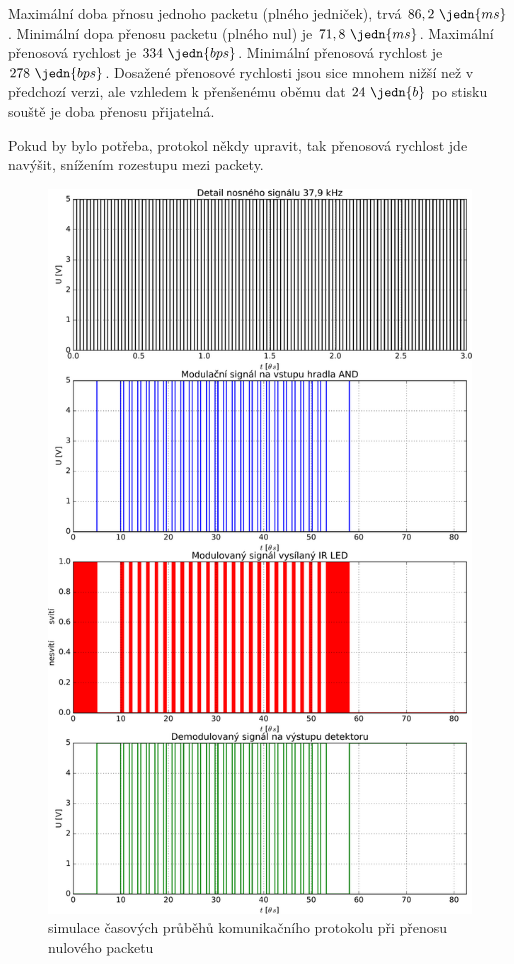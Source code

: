 Maximální doba přnosu jednoho packetu (plného jedniček), trvá $86,2~\jedn{ms}$. Minimální dopa přenosu packetu (plného nul) je $71,8~\jedn{ms}$. Maximální přenosová rychlost je $334~\jedn{bps}$. Minimální přenosová rychlost je $278~\jedn{bps}$. Dosažené přenosové rychlosti jsou sice mnohem nižší než v předchozí verzi, ale vzhledem k přenšenému oběmu dat $24~\jedn{b}$ po stisku souště je doba přenosu přijatelná.

Pokud by bylo potřeba, protokol někdy upravit, tak přenosová rychlost jde navýšit, snížením rozestupu mezi packety.


\begin{figure}[H]
    \begin{center}
        \includegraphics[height=0.97\textheight]{img/model-ir-komunikace}
    \end{center}
    \caption{simulace časových průběhů komunikačního protokolu při přenosu nulového packetu}
\end{figure}
